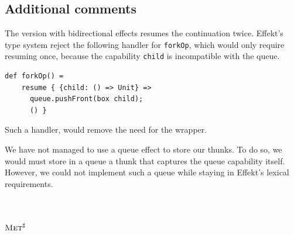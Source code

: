 \documentclass[sigplan, nonacm, natbib = false, review, screen]{acmart}
\newcommand{\Met}{\textsc{Met}\xspace}
\newcommand{\MetHO}{$\Met^\sharp$\xspace}
\begin{document}


\subsection{Additional comments}
The version with bidirectional effects resumes the continuation twice. Effekt's
type system reject the following handler for \texttt{\small forkOp}, which would
only require resuming once, because the capability \texttt{\small child} is
incompatible with the queue.
\begin{lstlisting}[style = effekt]
  def forkOp() =
    resume { {child: () => Unit} =>
      queue.pushFront(box child);
      () }
\end{lstlisting}
Such a handler, would remove the need for the wrapper.

We have not managed to use a queue effect to store our thunks. To do so, we
would must store in a queue a thunk that captures the queue capability
itself. However, we could not implement such a queue while staying in Effekt's
lexical requirements.
\section{\MetHO}




\end{document}
